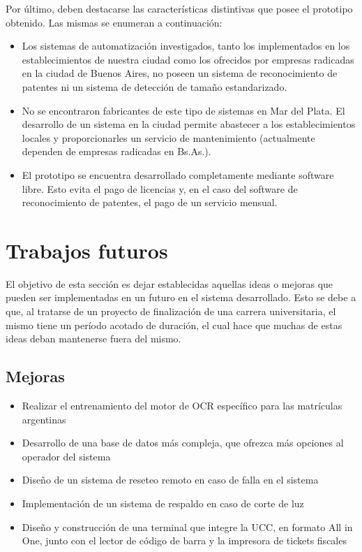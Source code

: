 Por último, deben destacarse las características distintivas que posee el prototipo obtenido. Las mismas se enumeran a continuación:

\begin{itemize}
	\item Los sistemas de automatización investigados, tanto los implementados en los establecimientos de nuestra ciudad como los ofrecidos por empresas radicadas en la ciudad de Buenos Aires, no poseen un sistema de reconocimiento de patentes ni un sistema de detección de tamaño estandarizado.
	\item No se encontraron fabricantes de este tipo de sistemas en Mar del Plata. El desarrollo de un sistema en la ciudad permite abastecer a los establecimientos locales y proporcionarles un servicio de mantenimiento (actualmente dependen de empresas radicadas en Bs.As.).
	\item El prototipo se encuentra desarrollado completamente mediante software libre. Esto evita el pago de licencias y, en el caso del software de reconocimiento de patentes, el pago de un servicio mensual.
\end{itemize}


\section{Trabajos futuros}

El objetivo de esta sección es dejar establecidas aquellas ideas o mejoras que pueden ser implementadas en un futuro en el sistema desarrollado. Esto se debe a que, al tratarse de un proyecto de finalización de una carrera universitaria, el mismo tiene un período acotado de duración, el cual hace que muchas de estas ideas deban mantenerse fuera del mismo.

\subsection{Mejoras}
\begin{itemize}
	\item Realizar el entrenamiento del motor de OCR específico para las matrículas argentinas
	\item Desarrollo de una base de datos más compleja, que ofrezca más opciones al operador del sistema
	\item Diseño de un sistema de reseteo remoto en caso de falla en el sistema
	\item Implementación de un sistema de respaldo en caso de corte de luz
	\item Diseño y construcción de una terminal que integre la UCC, en formato All in One, junto con el lector de código de barra y la impresora de tickets fiscales
\end{itemize}

